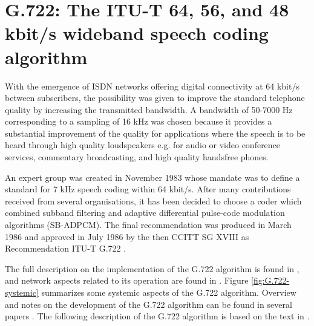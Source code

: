 \chapter{G.722: The ITU-T 64, 56, and 48 kbit/s wideband
         speech coding algorithm}

With the emergence of ISDN networks offering digital connectivity at
64 kbit/s between subscribers, the possibility was given to improve
the standard telephone quality by increasing the transmitted
bandwidth. A bandwidth of 50-7000 Hz corresponding to a sampling of 16
kHz was chosen because it provides a substantial improvement of the
quality for applications where the speech is to be heard through
high quality loudspeakers e.g. for audio or video conference services,
commentary broadcasting, and high quality handsfree phones.

An expert group was created in November 1983 whose mandate was to
define a standard for 7 kHz speech coding within 64 kbit/s. After many
contributions received from several organisations, it has been decided
to choose a coder which combined subband filtering and adaptive
differential pulse-code modulation algorithms (SB-ADPCM). The final
recommendation was produced in March 1986 and approved in July 1986 by
the then CCITT SG XVIII as Recommendation ITU-T G.722 \cite{G.722}.

The full description on the implementation of the G.722 algorithm is
found in \cite{G.722}, and network aspects related to its operation
are found in \cite{G.725}. Figure \ref{fig:G.722-systemic} summarizes
some systemic aspects of the G.722 algorithm. Overview and notes on
the development of the G.722 algorithm can be found in several papers
\cite{G.722:General,G.722:Overview,G.722:SubjTest,G.722:Implementation,
 G.722:Modes,G.722:Applications}.  The following description of the
G.722 algorithm is based on the text in \cite{G.722:Summary}.

